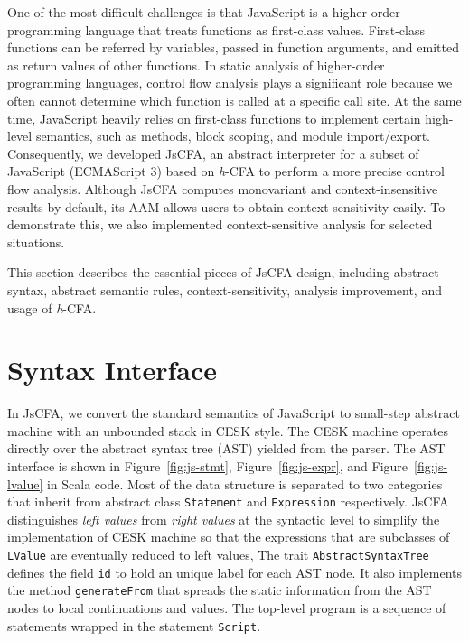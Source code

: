 \documentclass[12pt]{report}
\begin{document}
One of the most difficult challenges is that JavaScript is a higher-order programming language that treats functions as first-class values. First-class functions can be referred by variables, passed in function arguments, and emitted as return values of other functions.
In static analysis of higher-order programming languages, control flow analysis plays a significant role because we often cannot determine which function is called at a specific call site.
At the same time, JavaScript heavily relies on first-class functions to implement certain high-level semantics, such as methods, block scoping, and module import/export.
Consequently, we developed JsCFA, an abstract interpreter for a subset of JavaScript (ECMAScript 3) based on \textit{h}-CFA to perform a more precise control flow analysis.
Although JsCFA computes monovariant and context-insensitive results by default, its AAM allows users to obtain context-sensitivity easily.
To demonstrate this, we also implemented context-sensitive analysis for selected situations.

This section describes the essential pieces of JsCFA design, including abstract syntax, abstract semantic rules, context-sensitivity, analysis improvement, and usage of \textit{h}-CFA\@.

\section{Syntax Interface}
\label{sub:Syntax}

In JsCFA, we convert the standard semantics of JavaScript to small-step abstract machine with an unbounded stack in CESK style.
The CESK machine operates directly over the abstract syntax tree (AST) yielded from the parser.
The AST interface is shown in Figure~\ref{fig:js-stmt}, Figure~\ref{fig:js-expr}, and Figure~\ref{fig:js-lvalue}  in Scala code.
Most of the data structure is separated to two categories that inherit from abstract class \verb|Statement| and \verb|Expression| respectively.
JsCFA distinguishes \emph{left values} from \emph{right values} at the syntactic level to simplify the implementation of CESK machine so that the expressions that are subclasses of \verb|LValue| are eventually reduced to left values,
The trait \verb|AbstractSyntaxTree| defines the field \verb|id| to hold an unique label for each AST node.
It also implements the method \verb|generateFrom| that spreads the static information from the AST nodes to
local continuations and values.
The top-level program is a sequence of statements wrapped in the statement \verb|Script|.
\end{document}
